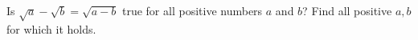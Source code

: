 Is $\sqrt a-\sqrt b=\sqrt{a-b}$ true for all positive numbers $a$ and $b$? Find all positive $a,b$ for which it holds.
